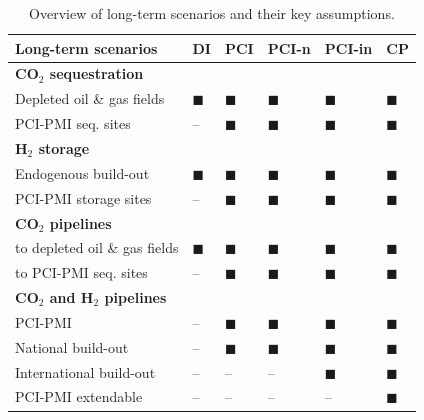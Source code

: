 \documentclass[pdflatex,sn-nature]{sn-jnl}%
\theoremstyle{thmstyleone}%
\theoremstyle{thmstyletwo}%
\theoremstyle{thmstylethree}%
\begin{document}
\begin{table}[htpb]
  \centering
  \caption{Overview of long-term scenarios and their key assumptions.}
  \label{tab:long-term_scenarios}
  \scriptsize
  \begin{tabularx}{\linewidth}{R{4.2cm}>{\centering\arraybackslash}X>{\centering\arraybackslash}X>{\centering\arraybackslash}X>{\centering\arraybackslash}X>{\centering\arraybackslash}X}
    \toprule
    \textbf{Long-term scenarios} & 
    \textbf{DI} & 
    \textbf{PCI} & 
    \textbf{PCI-n} & 
    \textbf{PCI-in} & 
    \textbf{CP} \\
    \midrule
    \textbf{CO$_2$ sequestration} & & & & & \\
    Depleted oil \& gas fields\footnotemark[1] & $\blacksquare$ & $\blacksquare$ & $\blacksquare$ & $\blacksquare$ & $\blacksquare$ \\
    PCI-PMI seq. sites\footnotemark[2] & -- & $\blacksquare$ & $\blacksquare$ & $\blacksquare$ & $\blacksquare$ \\
    \midrule
    \textbf{H$_2$ storage} & & & & & \\
    Endogenous build-out & $\blacksquare$ & $\blacksquare$ & $\blacksquare$ & $\blacksquare$ & $\blacksquare$ \\
    PCI-PMI storage sites & -- & $\blacksquare$ & $\blacksquare$ & $\blacksquare$ & $\blacksquare$ \\
    \midrule
    \textbf{CO$_2$ pipelines} & & & & & \\
    to depleted oil \& gas fields & $\blacksquare$ & $\blacksquare$ & $\blacksquare$ & $\blacksquare$ & $\blacksquare$ \\
    to PCI-PMI seq. sites & -- & $\blacksquare$ & $\blacksquare$ & $\blacksquare$ & $\blacksquare$ \\
    \midrule
    \textbf{CO$_2$ and H$_2$ pipelines} & & & & & \\
    PCI-PMI & -- & $\blacksquare$ & $\blacksquare$ & $\blacksquare$ & $\blacksquare$ \\
    National build-out & -- & $\blacksquare$ & $\blacksquare$ & $\blacksquare$ & $\blacksquare$ \\
    International build-out & -- & -- & -- & $\blacksquare$ & $\blacksquare$ \\
    PCI-PMI extendable & -- & -- & -- & -- & $\blacksquare$ \\
    \bottomrule
  \end{tabularx}
  \centering
\end{table}
\end{document}
